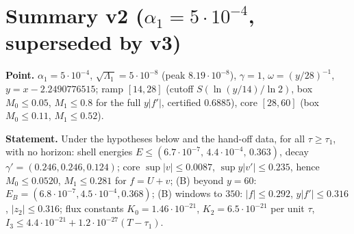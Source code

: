 \documentclass[11pt]{article}
\begin{document}
\section*{Summary v2 ($\alpha_1=5\cdot10^{-4}$, superseded by v3)}
\scriptsize\noindent\textbf{Point.} $\alpha_1=5\cdot10^{-4}$, $\sqrt{\Lambda_1}=5\cdot10^{-8}$ (peak $8.19\cdot10^{-8}$), $\gamma=1$, $\omega=(y/28)^{-1}$, $y=x-2.2490776515$; ramp $[14,28]$ (cutoff $S(\ln(y/14)/\ln2)$, box $M_0\le0.05$, $M_1\le0.8$ for the full $y|f'|$, certified $0.6885$), core $[28,60]$ (box $M_0\le0.11$, $M_1\le0.52$).

\noindent\textbf{Statement.} Under the hypotheses below and the hand-off data, for all $\tau\ge\tau_1$, with no horizon: shell energies $E\le(6.7\cdot10^{-7},\,4.4\cdot10^{-4},\,0.363)$, decay $\gamma'=(0.246,0.246,0.124)$; core $\sup|v|\le0.0087$, $\sup y|v'|\le0.235$, hence $M_0\le0.0520$, $M_1\le0.281$ for $f=U+v$; (B) beyond $y=60$: $E_B=(6.8\cdot10^{-7},4.5\cdot10^{-4},0.368)$; (B) windows to $350$: $|f|\le0.292$, $y|f'|\le0.316$, $|z_2|\le0.316$; flux constants $K_0=1.46\cdot10^{-21}$, $K_2=6.5\cdot10^{-21}$ per unit $\tau$, $I_3\le4.4\cdot10^{-21}+1.2\cdot10^{-27}(T-\tau_1)$.
\end{document}
